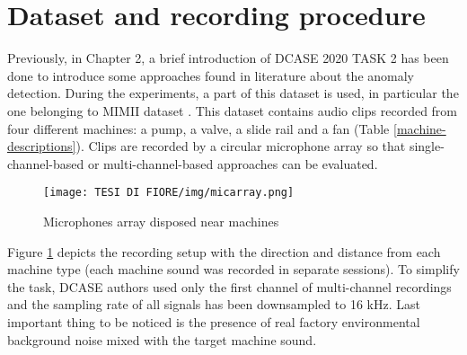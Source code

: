 \section{Dataset and recording procedure}
Previously, in Chapter 2, a brief introduction of DCASE 2020 TASK 2 has been done to introduce some approaches found in literature about the anomaly detection. During the experiments, a part of this dataset is used, in particular the one belonging to MIMII dataset \cite{20MIMIIDataset}.
This dataset contains audio clips recorded from four different machines: a pump, a valve, a slide rail and a fan (Table \ref{machine-descriptions}). Clips are recorded by a circular microphone array so that single-channel-based or multi-channel-based approaches can be evaluated.
\begin{figure}[ht]
\texttt{[image: TESI DI FIORE/img/micarray.png]}
\centering
\caption{Microphones array disposed near machines \cite{DCASE}}
\label{micarray}
\end{figure}
Figure \ref{micarray} depicts the recording setup with the direction and distance from each machine type (each machine sound was recorded in separate sessions). To simplify the task, DCASE authors used only the first channel of multi-channel recordings and the sampling rate of all signals has been downsampled to 16 kHz. Last important thing to be noticed is the presence of real factory environmental background noise mixed with the target machine sound.\\

